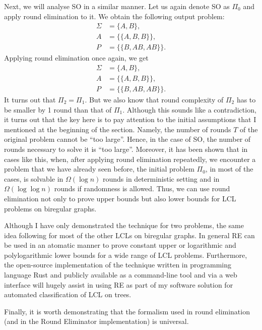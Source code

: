Next, we will analyse SO in a similar manner. Let us again denote SO as $\Pi_0$ and apply
round elimination to it. We obtain the following output problem:
\begin{align*}
\Sigma &= \{A, B\}, \\
A &= \{ \{A, B, B\} \}, \\
P &= \{ \{B, AB, AB\}\}.
\end{align*}
Applying round elimination once again, we get
\begin{align*}
\Sigma &= \{A, B\}, \\
A &= \{ \{A, B, B\} \}, \\
P &= \{ \{B, AB, AB\}\}.
\end{align*}
It turns out that $\Pi_2 = \Pi_1$. But we also know that round complexity of $\Pi_2$
has to be smaller by 1 round than that of $\Pi_1$. Although this sounds like a contradiction,
it turns out that the key here is to pay attention to the initial assumptions that I mentioned at the
beginning of the section. Namely, the number of rounds $T$ of the original problem cannot be ``too large''.
Hence, in the case of SO, the number of rounds necessary to solve it is ``too large''. Moreover,
it has been shown that in cases like this, when, after applying round elimination repeatedly,
we encounter a problem that we have already seen before, the initial problem $\Pi_0$, in most of the cases,
is solvable in $\Omega(\log n)$ rounds in deterministic setting and in $\Omega(\log \log n)$ rounds
if randomness is allowed. Thus, we can use round elimination not only to prove upper bounds but
also lower bounds for LCL problems on biregular graphs.

Although I have only demonstrated the technique for two problems, the same idea following for most of the
other LCLs on biregular graphs. In general RE can be used in an atomatic manner to prove constant upper or
logarithmic and polylogarithmic lower bounds for a wide range of LCL problems. Furthermore, the open-source
implementation
of the technique written in programming language Rust and publicly available as a command-line tool and via
a web interface will hugely assist in using RE as part of my software solution for automated classification
of LCL on trees.

Finally, it is worth demonstrating that the formalism used in round
elimination (and in the Round Eliminator implementation) is universal.

